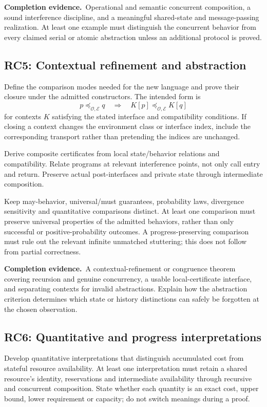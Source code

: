 \documentclass[11pt,a4paper]{article}
\newcommand{\deliver}{\par\textbf{Completion evidence.}\ }
\begin{document}
\deliver Operational and semantic concurrent composition, a sound interference discipline, and a meaningful shared-state and message-passing realization. At least one example must distinguish the concurrent behavior from every claimed serial or atomic abstraction unless an additional protocol is proved.

\subsection*{RC5: Contextual refinement and abstraction}\label{rc5}
Define the comparison modes needed for the new language and prove their closure under the admitted constructors. The intended form is
\[
p\preceq_{\mathcal O,\mathcal E}q
\quad\Longrightarrow\quad
K[p]\preceq_{\mathcal O,\mathcal E}K[q]
\]
for contexts \(K\) satisfying the stated interface and compatibility conditions. If closing a context changes the environment class or interface index, include the corresponding transport rather than pretending the indices are unchanged.

Derive composite certificates from local state/behavior relations and compatibility. Relate programs at relevant interference points, not only call entry and return. Preserve actual post-interfaces and private state through intermediate composition.

Keep may-behavior, universal/must guarantees, probability laws, divergence sensitivity and quantitative comparisons distinct. At least one comparison must preserve universal properties of the admitted behaviors, rather than only successful or positive-probability outcomes. A progress-preserving comparison must rule out the relevant infinite unmatched stuttering; this does not follow from partial correctness.

\deliver A contextual-refinement or congruence theorem covering recursion and genuine concurrency, a usable local-certificate interface, and separating contexts for invalid abstractions. Explain how the abstraction criterion determines which state or history distinctions can safely be forgotten at the chosen observation.

\subsection*{RC6: Quantitative and progress interpretations}\label{rc6}
Develop quantitative interpretations that distinguish accumulated cost from stateful resource availability. At least one interpretation must retain a shared resource's identity, reservations and intermediate availability through recursive and concurrent composition. State whether each quantity is an exact cost, upper bound, lower requirement or capacity; do not switch meanings during a proof.
\end{document}
